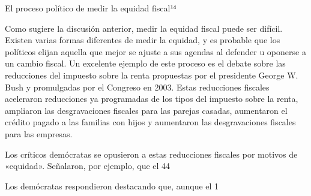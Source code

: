 \documentclass[10pt,a4paper]{article}
\begin{document}
El proceso político de medir la equidad fiscal¹⁴

Como sugiere la discusión anterior, medir la equidad fiscal puede ser difícil. Existen varias formas diferentes de medir la equidad, y es probable que los políticos elijan aquella que mejor se ajuste a sus agendas al defender u oponerse a un cambio fiscal. Un excelente ejemplo de este proceso es el debate sobre las reducciones del impuesto sobre la renta propuestas por el presidente George W. Bush y promulgadas por el Congreso en 2003. Estas reducciones fiscales aceleraron reducciones ya programadas de los tipos del impuesto sobre la renta, ampliaron las desgravaciones fiscales para las parejas casadas, aumentaron el crédito pagado a las familias con hijos y aumentaron las desgravaciones fiscales para las empresas.

Los críticos demócratas se opusieron a estas reducciones fiscales por motivos de «equidad». Señalaron, por ejemplo, que el 44 %

Los demócratas respondieron destacando que, aunque el 1 %
\end{document}
